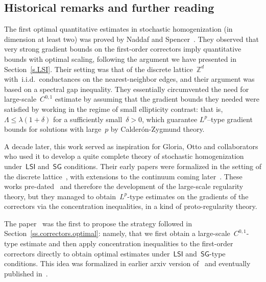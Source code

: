 \documentclass[11pt]{article} %
\numberwithin{equation}{section}
\theoremstyle{definition}
\newcommand*{\Zd}{\ensuremath{\mathbb{Z}^d}}
\newcommand{\LSI}{\mathsf{LSI}}
\newcommand{\SG}{\mathsf{SG}}
\begin{document}
\subsection*{Historical remarks and further reading}


The first optimal quantitative estimates in stochastic homogenization (in dimension at least two) was proved by Naddaf and Spencer~\cite{NS2}.
They observed that very strong gradient bounds on the first-order correctors imply quantitative bounds with optimal scaling, following the argument we have presented in Section~\ref{s.LSI}. Their setting was that of the discrete lattice~$\Zd$ with~i.i.d.~conductances on the nearest-neighbor edges, and their argument was based on a spectral gap inequality. They essentially circumvented the need for large-scale~$C^{0,1}$ estimate by assuming that the gradient bounds they needed were satisfied by working in the regime of small ellipticity contrast: that is,~$\Lambda\leq \lambda (1+\delta)$ for a sufficiently small~$\delta>0$, which guarantee $L^p$--type gradient bounds for solutions with large~$p$ by Calder\'on-Zygmund theory. 

\smallskip

A decade later, this work served as inspiration for Gloria, Otto and collaborators who used it to develop a quite complete theory of stochastic homogenization under~$\LSI$ and~$\SG$ conditions. Their early papers were formalized in the setting of the discrete lattice~\cite{GO1,GO2,GNO,MO}, with extensions to the continuum coming later~\cite{GO3}. These works pre-dated~\cite{AS} and therefore the development of the large-scale regularity theory, but they managed to obtain~$L^p$-type estimates on the gradients of the correctors via the concentration inequalities, in a kind of proto-regularity theory.  

\smallskip

The paper~\cite{AS} was the first to propose the strategy followed in Section~\ref{ss.correctors.optimal}: namely, that we first obtain a large-scale~$C^{0,1}$-type estimate and then apply concentration inequalities to the first-order correctors directly to obtain optimal estimates under~$\LSI$ and~$\SG$-type conditions. This idea was formalized in earlier arxiv version of~\cite{GNO3} and eventually published in~\cite{GNO4}. 

\smallskip
\end{document}
